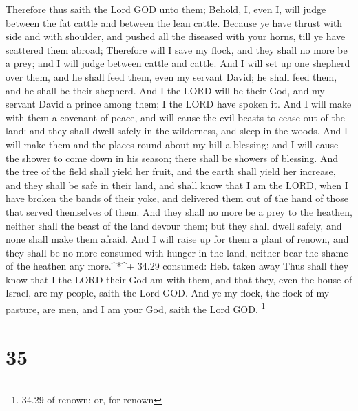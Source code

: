  Therefore thus saith the Lord GOD unto them; Behold, I,
even I, will judge between the fat cattle and between the lean cattle.
 Because ye have thrust with side and with shoulder, and
pushed all the diseased with your horns, till ye have scattered them
abroad;  Therefore will I save my flock, and they shall no
more be a prey; and I will judge between cattle and cattle.
 And I will set up one shepherd over them, and he shall
feed them, even my servant David; he shall feed them, and he shall be
their shepherd.  And I the LORD will be their God, and my
servant David a prince among them; I the LORD have spoken it.
 And I will make with them a covenant of peace, and will
cause the evil beasts to cease out of the land: and they shall dwell
safely in the wilderness, and sleep in the woods.  And I
will make them and the places round about my hill a blessing; and I will
cause the shower to come down in his season; there shall be showers of
blessing.  And the tree of the field shall yield her fruit,
and the earth shall yield her increase, and they shall be safe in their
land, and shall know that I am the LORD, when I have broken the bands of
their yoke, and delivered them out of the hand of those that served
themselves of them.  And they shall no more be a prey to
the heathen, neither shall the beast of the land devour them; but they
shall dwell safely, and none shall make them afraid.  And I
will raise up for them a plant of renown, and they shall be no more
consumed with hunger in the land, neither bear the shame of the heathen
any more.\^{}*\^{}+ 34.29 consumed: Heb. taken away  Thus
shall they know that I the LORD their God am with them, and that they,
even the house of Israel, are my people, saith the Lord GOD.
 And ye my flock, the flock of my pasture, are men, and I
am your God, saith the Lord GOD. \footnote{34.29 of renown: or, for
  renown}

\hypertarget{section-34}{%
\section{35}\label{section-34}}

